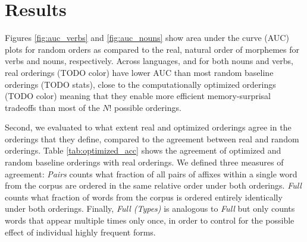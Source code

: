 \documentclass[11pt,letterpaper]{article}
\newcommand{\citet}{\Textcite}
\newcommand\becky[1]{{\color{blue}(#1)}}
\newcounter{def}
\begin{document}



\section{Results}
Figures \ref{fig:auc_verbs} and \ref{fig:auc_nouns} show area under the curve (AUC) plots for random orders as compared to the real, natural order of morphemes for verbs and nouns, respectively.
Across languages, and for both nouns and verbs, real orderings (TODO color) have lower AUC than most random baseline orderings (TODO stats), close to the computationally optimized orderings (TODO color) meaning that they enable more efficient memory-surprisal tradeoffs than most of the $N!$ possible orderings. 

Second, we evaluated to what extent real and optimized orderings agree in the orderings that they define, compared to the agreement between real and random orderings.
Table \ref{tab:optimized_acc} shows the agreement of optimized and random baseline orderings with real orderings.
We defined three measures of agreement:
\textit{Pairs} counts what fraction of all pairs of affixes within a single word from the corpus are ordered in the same relative order under both orderings.
\textit{Full} counts what fraction of words from the corpus is ordered entirely identically under both orderings.
Finally, \textit{Full (Types)} is analogous to \textit{Full} but only counts words that appear multiple times only once, in order to control for the possible effect of individual highly frequent forms.
\end{document}
